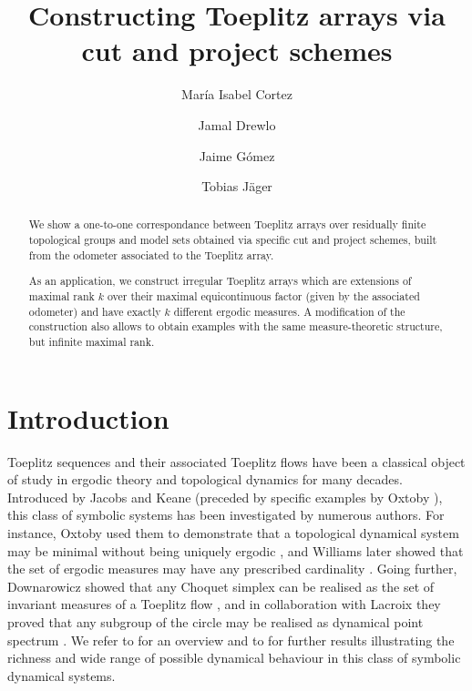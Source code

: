 \documentclass[titlepage,reqno,10pt]{amsart}
\author[M.I. Cortez]{Mar{\'i}a Isabel Cortez}
\author[J. Drewlo]{Jamal Drewlo}
\author[J. G{\'o}mez]{Jaime G{\'o}mez}
\author[T. J{\"a}ger]{Tobias J{\"a}ger}
\theoremstyle{definition}
\begin{document}
\title[Constructing Toeplitz arrays via cut and project schemes]{Constructing Toeplitz arrays via cut and project schemes} 

\date{}

\begin{abstract}
    We show a one-to-one correspondance between Toeplitz arrays over residually finite topological groups and model sets obtained via specific cut and project schemes, built from the odometer associated to the Toeplitz array. 

    As an application, we construct irregular Toeplitz arrays which are extensions of maximal rank $k$ over their maximal equicontinuous factor (given by the associated odometer) and have exactly $k$ different ergodic measures. A modification of the construction also allows to obtain examples with the same measure-theoretic structure, but infinite maximal rank. 
\end{abstract}

\maketitle 

\section{Introduction}

Toeplitz sequences and their associated Toeplitz flows have been a classical object of study in ergodic theory and topological dynamics for many decades. Introduced by Jacobs and Keane \cite{JK69} (preceded by specific examples by Oxtoby \cite{Ox52}), this class of symbolic systems has been investigated by numerous authors. For instance, Oxtoby used them to demonstrate that a topological dynamical system may be minimal without being uniquely ergodic \cite{Ox52}, and Williams later showed that the set of ergodic measures may have any prescribed cardinality \cite{Wi84}. Going further, Downarowicz showed that any Choquet simplex can be realised as the set of invariant measures of a Toeplitz flow \cite{Dow91}, and in collaboration with Lacroix they proved that any subgroup of the circle may be realised as dynamical point spectrum \cite{DL96}. We refer to \cite{Do05} for an overview and to \cite{Dow88,IL94,MP79} for further results illustrating the richness and wide range of possible dynamical behaviour in this class of symbolic dynamical systems.
\end{document}
